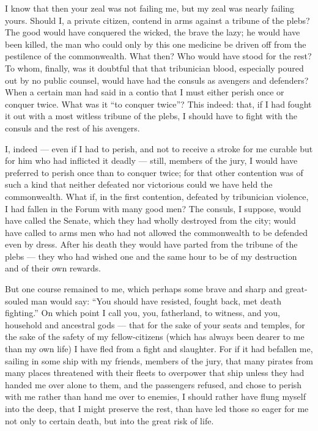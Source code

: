  I know that then your zeal was not failing me, but my zeal was nearly failing yours. Should I, a private citizen, contend in arms against a tribune of the plebs? The good would have conquered the wicked, the brave the lazy; he would have been killed, the man who could only by this one medicine be driven off from the pestilence of the commonwealth. What then? Who would have stood for the rest? To whom, finally, was it doubtful that that tribunician blood, especially poured out by no public counsel, would have had the consuls as avengers and defenders? When a certain man had said in a contio that I must either perish once or conquer twice. What was it ``to conquer twice''? This indeed: that, if I had fought it out with a most witless tribune of the plebs, I should have to fight with the consuls and the rest of his avengers.

 I, indeed --- even if I had to perish, and not to receive a stroke for me curable but for him who had inflicted it deadly --- still, members of the jury, I would have preferred to perish once than to conquer twice; for that other contention was of such a kind that neither defeated nor victorious could we have held the commonwealth. What if, in the first contention, defeated by tribunician violence, I had fallen in the Forum with many good men? The consuls, I suppose, would have called the Senate, which they had wholly destroyed from the city; would have called to arms men who had not allowed the commonwealth to be defended even by dress. After his death they would have parted from the tribune of the plebs --- they who had wished one and the same hour to be of my destruction and of their own rewards.

 But one course remained to me, which perhaps some brave and sharp and great-souled man would say: ``You should have resisted, fought back, met death fighting.'' On which point I call you, you, fatherland, to witness, and you, household and ancestral gods --- that for the sake of your seats and temples, for the sake of the safety of my fellow-citizens (which has always been dearer to me than my own life) I have fled from a fight and slaughter. For if it had befallen me, sailing in some ship with my friends, members of the jury, that many pirates from many places threatened with their fleets to overpower that ship unless they had handed me over alone to them, and the passengers refused, and chose to perish with me rather than hand me over to enemies, I should rather have flung myself into the deep, that I might preserve the rest, than have led those so eager for me not only to certain death, but into the great risk of life.


